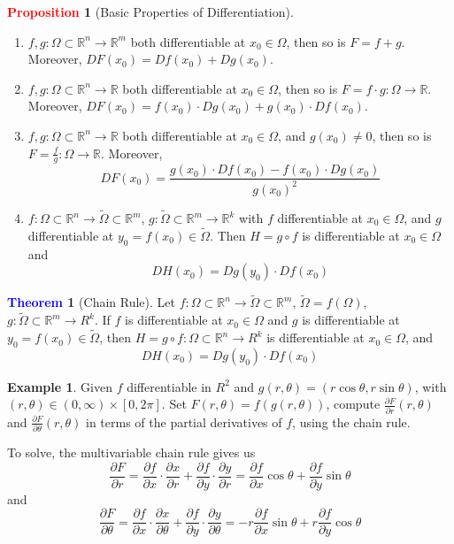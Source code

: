 \documentclass[11pt]{article}
\theoremstyle{definition}
\newtheorem{exmp}{Example}[section]
\theoremstyle{definition}
\newcommand{\R}[0]{\mathbb{R}}
\newcommand{\pdv}[2]{\frac{\partial #1}{\partial #2}}
\newtheorem{theorem}{\textcolor{blue}{Theorem}}
\theoremstyle{definition}
\newtheorem{prop}{\textcolor{red}{Proposition}}
\theoremstyle{remark}
\begin{document}
\begin{prop}[Basic Properties of Differentiation]
    \leavevmode
    \begin{enumerate}
        \item $f, g : \Omega \subset \R^n \to \R^m$ both differentiable at $x_0 \in \Omega$,
        then so is $F = f + g$. Moreover, $DF(x_0) = Df(x_0) + Dg(x_0)$.
        \item $f, g : \Omega \subset \R^n \to \R$ both differentiable at $x_0 \in \Omega$,
        then so is $F = f \cdot g : \Omega \to \R$. Moreover,
        $DF(x_0) = f(x_0) \cdot Dg(x_0) + g(x_0) \cdot Df(x_0)$.
        \item  $f, g : \Omega \subset \R^n \to \R$ both differentiable at $x_0 \in \Omega$,
        and $g(x_0) \neq 0$, then so is $F = \frac{f}{g} : \Omega \to \R$. Moreover,
        \[
            DF(x_0) = \frac{g(x_0) \cdot Df(x_0) - f(x_0) \cdot Dg(x_0)}{g(x_0)^2}
        \]  
        \item $f : \Omega \subset \R^n \to \tilde{\Omega} \subset \R^m$, 
        $g : \tilde{\Omega} \subset \R^m \to \R^k$ with $f$ differentiable at $x_0 \in \Omega$,
        and $g$ differentiable at $y_0 = f(x_0) \in \tilde{\Omega}$. Then 
        $H = g \circ f$ is differentiable at $x_0 \in \Omega$ and
        \[
            DH(x_0) = Dg(y_0) \cdot Df(x_0)
        \]       
    \end{enumerate}
\end{prop}

\begin{theorem}[Chain Rule]
    Let $f : \Omega \subset \R^n \to \tilde{\Omega} \subset \R^m$, $\tilde{\Omega} = f(\Omega)$,
    $g : \tilde{\Omega} \subset \R^m \to R^k$. If $f$ is differentiable at $x_0 \in \Omega$ and 
    $g$ is differentiable at $y_0 = f(x_0) \in \tilde{\Omega}$, then 
    $H = g \circ f : \Omega \subset \R^n \to R^k$ is differentiable at $x_0 \in \Omega$, and
    \[
        DH(x_0) = Dg(y_0) \cdot Df(x_0)
    \]      
\end{theorem}

\begin{exmp}
    Given $f$ differentiable in $R^2$ and $g(r, \theta) = (r\cos \theta, r\sin \theta)$, 
    with $(r, \theta) \in (0, \infty) \times [0, 2\pi]$. Set $F(r, \theta) = f(g(r, \theta))$,
    compute $\pdv{F}{r}(r, \theta)$ and $\pdv{F}{\theta}(r, \theta)$ in terms of the partial 
    derivatives of $f$, using the chain rule.

    To solve, the multivariable chain rule gives us
    \[
        \pdv{F}{r} = \pdv{f}{x} \cdot \pdv{x}{r} + \pdv{f}{y} \cdot \pdv{y}{r} = \pdv{f}{x} \cos \theta + \pdv{f}{y} \sin \theta
    \] 
    and
    \[
        \pdv{F}{\theta} = \pdv{f}{x} \cdot \pdv{x}{\theta} + \pdv{f}{y} \cdot \pdv{y}{\theta} = -r \pdv{f}{x} \sin \theta + r \pdv{f}{y} \cos \theta
    \] 

\end{exmp}
\end{document}

